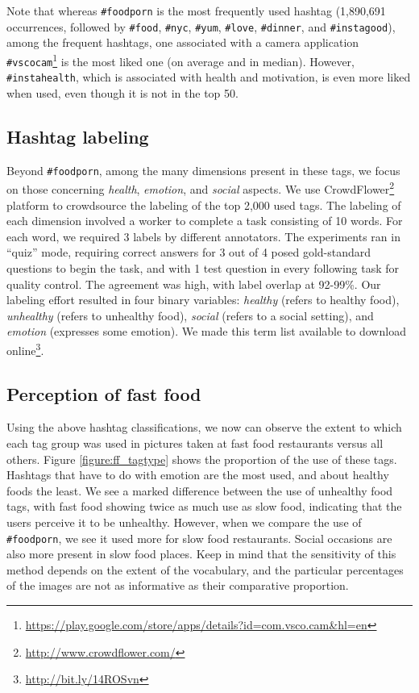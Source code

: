 \documentclass{sig-alternate-2013}
\begin{document}
Note that whereas \texttt{\#foodporn} is the most frequently used hashtag (1,890,691 occurrences, followed by \texttt{\#food}, \texttt{\#nyc}, \texttt{\#yum}, \texttt{\#love}, \texttt{\#dinner}, and  \texttt{\#instagood}), among the frequent hashtags, one associated with a camera application \texttt{\#vscocam}\footnote{\url{https://play.google.com/store/apps/details?id=com.vsco.cam&hl=en}} is the most liked one (on average and in median). However, \texttt{\#instahealth}, which is associated with health and motivation, is even more liked when used, even though it is not in the top 50.


\subsection{Hashtag labeling}

Beyond \texttt{\#foodporn}, among the many dimensions present in these tags, we focus on those concerning \emph{health}, \emph{emotion}, and \emph{social} aspects. We use CrowdFlower\footnote{\url{http://www.crowdflower.com/}} platform to crowdsource the labeling of the top 2,000 used tags. The labeling of each dimension involved a worker to complete a task consisting of 10 words. For each word, we required 3 labels by different annotators. The experiments ran in ``quiz'' mode, requiring correct answers for 3 out of 4 posed gold-standard questions to begin the task, and with 1 test question in every following task for quality control. The agreement was high, with label overlap at 92-99\%. Our labeling effort resulted in four binary variables: \emph{healthy} (refers to healthy food), \emph{unhealthy} (refers to unhealthy food), \emph{social} (refers to a social setting), and \emph{emotion} (expresses some emotion). We made this term list available to download online\footnote{\url{http://bit.ly/14ROSvn}}. 


\subsection{Perception of fast food}

Using the above hashtag classifications, we now can observe the extent to which each tag group was used in pictures taken at fast food restaurants versus all others. Figure \ref{figure:ff_tagtype} shows the proportion of the use of these tags. Hashtags that have to do with emotion are the most used, and about healthy foods the least. We see a marked difference between the use of unhealthy food tags, with fast food showing twice as much use as slow food, indicating that the users perceive it to be unhealthy. However, when we compare the use of \texttt{\#foodporn}, we see it used more for slow food restaurants. Social occasions are also more present in slow food places. Keep in mind that the sensitivity of this method depends on the extent of the vocabulary, and the particular percentages of the images are not as informative as their comparative proportion.
\end{document}
